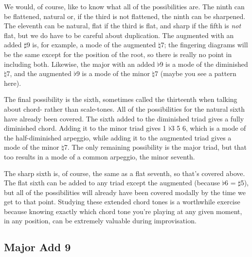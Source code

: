 \documentclass[english]{./gbook}
\begin{document}
\begin{large}
We would, of course, like to know what all of the possibilities are. The ninth can be flattened, natural or, if the third is not flattened, the ninth can be sharpened. The eleventh can be natural, flat if the third is flat, and sharp if the fifth is \emph{not} flat, but we do have to be careful about duplication. The augmented with an added $\sharp$9 is, for example, a mode of the augmented $\natural$7; the fingering diagrams will be the same except for the position of the root, so there is really no point in including both. Likewise, the major with an added $\flat$9 is a mode of the diminished $\natural$7, and the augmented $\flat$9 is a mode of the minor $\natural$7 (maybe you see a pattern here).

The final possibility is the sixth, sometimes called the thirteenth when talking about chord- rather than scale-tones. All of the possibilities for the natural sixth have already been covered. The sixth added to the diminished triad gives a fully diminished chord. Adding it to the minor triad gives 1 $\flat$3 5 6, which is a mode of the half-diminished arpeggio, while adding it to the augmented triad gives a mode of the minor $\natural$7. The only remaining possibility is the major triad, but that too results in a mode of a common arpeggio, the minor seventh.

The sharp sixth is, of course, the same as a flat seventh, so that's covered above. The flat sixth can be added to any triad except the augmented (because $\flat$6 = $\sharp$5), but all of the possibilities will already have been covered modally by the time we get to that point. Studying these extended chord tones is a worthwhile exercise because knowing exactly which chord tone you're playing at any given moment, in any position, can be extremely valuable during improvisation.

\subsection*{Major Add 9}

\[
\begin{array}{ll}
	\begin{array}{c}
		\begin{array}{ccc}
			&%
			&%
		\end{array}
		\\
		\begin{array}{cc}
			&%
		\end{array}
	\end{array}


\end{array}\]
\end{large}
\end{document}
